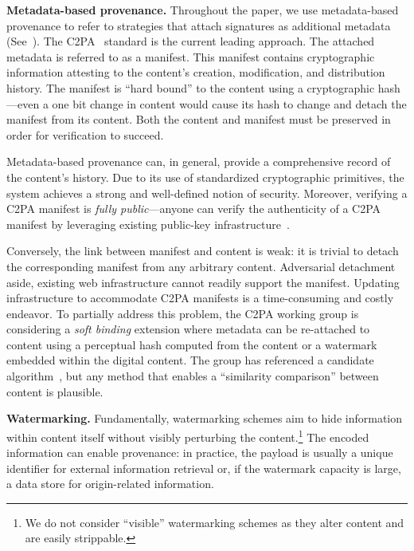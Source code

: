 \documentclass[12pt]{article}
\begin{document}
\textbf{Metadata-based provenance.}
Throughout the paper, we use metadata-based provenance to refer to strategies that attach signatures as additional metadata (See~).
The C2PA~\citep{c2pa2023coalition} standard is the current leading approach.
The attached metadata is referred to as a manifest.
This manifest contains cryptographic information attesting to the content's creation, modification, and distribution history.
The manifest is ``hard bound'' to the content using a cryptographic hash---even a one bit change in content would cause its hash to change and detach the manifest from its content.
Both the content and manifest must be preserved in order for verification to succeed.

Metadata-based provenance can, in general, provide a comprehensive record of the content's history.
Due to its use of standardized cryptographic primitives, the system achieves a strong and well-defined notion of security.
Moreover, verifying a C2PA manifest is \textit{fully public}---anyone can verify the authenticity of a C2PA manifest by leveraging existing public-key infrastructure~\citep{laurie2014certificate}.

Conversely, the link between manifest and content is weak: it is trivial to detach the corresponding manifest from any arbitrary content.
Adversarial detachment aside, existing web infrastructure cannot readily support the manifest.
Updating infrastructure to accommodate C2PA manifests is a time-consuming and costly endeavor.
To partially address this problem, the C2PA working group is considering a \textit{soft binding} extension where metadata can be re-attached to content using a perceptual hash computed from the content or a watermark embedded within the digital content.
The group has referenced a candidate algorithm~\citep{iscc2024enhancement}, but any method that enables a ``similarity comparison'' between content is plausible.

\textbf{Watermarking.}
Fundamentally, watermarking schemes aim to hide information within content itself without visibly perturbing the content.\footnote{We do not consider ``visible'' watermarking schemes as they alter content and are easily strippable.}
The encoded information can enable provenance: in practice, the payload is usually a unique identifier for external information retrieval or, if the watermark capacity is large, a data store for origin-related information.
\end{document}
